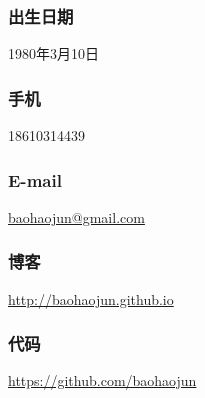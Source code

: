 \documentclass[11pt,dvipdfm,CJKbookmarks]{article}
\begin{document}
\begin{CJK*}{UTF8}{simsun}
\subsubsection{出生日期}
\label{sec-5-0-1}
1980年3月10日

\subsubsection{手机}
\label{sec-5-0-2}
18610314439

\subsubsection{E-mail}
\label{sec-5-0-3}
\href{mailto:baohaojun@gmail.com}{baohaojun@gmail.com}

\subsubsection{博客}
\label{sec-5-0-4}
\url{http://baohaojun.github.io}

\subsubsection{代码}
\label{sec-5-0-5}
\url{https://github.com/baohaojun}   


\end{CJK*}
\end{document}
